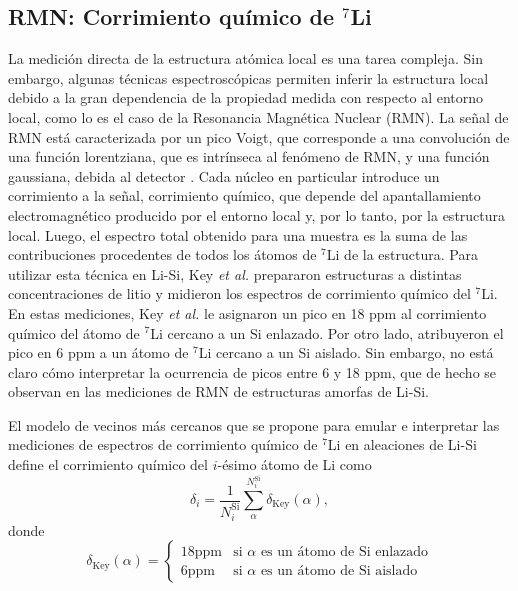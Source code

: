 \subsection{RMN: Corrimiento químico de $^7$Li}

La medición directa de la estructura atómica local es una tarea compleja. Sin
embargo, algunas técnicas espectroscópicas permiten inferir la estructura local 
debido a la gran dependencia de la propiedad medida con respecto al entorno local, 
como lo es el caso de la Resonancia Magnética Nuclear (RMN). La señal de RMN está caracterizada por un pico 
Voigt, que corresponde a una convolución de una función lorentziana, que 
es intrínseca al fenómeno de RMN, y una función gaussiana, debida al detector
\cite{higinbotham2001}. Cada núcleo en particular introduce un corrimiento a la 
señal, corrimiento químico, que depende del apantallamiento electromagnético 
producido por el entorno local y, por lo tanto, por la estructura local. Luego,
el espectro total obtenido para una muestra es la suma de las contribuciones 
procedentes de todos los átomos de $^7$Li de la estructura. Para utilizar esta 
técnica en Li-Si, Key \textit{et al.} \cite{key2009} prepararon estructuras
a distintas concentraciones de litio y midieron los espectros de corrimiento 
químico del $^7$Li. En estas mediciones, Key \textit{et al.} \cite{key2009} 
le asignaron un pico en 18 ppm al corrimiento químico del átomo de $^7$Li 
cercano a un Si enlazado. Por otro lado, atribuyeron el pico en 6 ppm a un 
átomo de $^7$Li cercano a un Si aislado. Sin embargo, no está claro cómo 
interpretar la ocurrencia de picos entre 6 y 18 ppm, que de hecho se observan 
en las mediciones de RMN de estructuras amorfas de Li-Si.

El modelo de vecinos más cercanos que se propone para emular e interpretar las 
mediciones de espectros de corrimiento químico de $^7$Li en aleaciones de Li-Si 
define el corrimiento químico del $i$-ésimo átomo de Li como
\begin{equation}\label{eq:dli}
    \delta_{i} = \frac{1}{N_i^{\text{Si}}} \sum^{N_i^{\text{Si}}}_{\alpha} \delta_{\text{Key}}(\alpha),
\end{equation}
donde
\begin{equation}\label{eq:dkey}
    \delta_{\text{Key}}(\alpha)=\begin{cases}
    18 \text{ppm} & \text{si } \alpha \text{ es un átomo de Si enlazado}\\
    6 \text{ppm} & \text{si } \alpha \text{ es un átomo de Si aislado} 
    \end{cases}
\end{equation}

